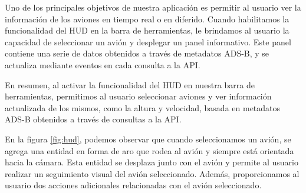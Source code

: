 \documentclass[a4paper, 11pt]{book}
\begin{document}
Uno de los principales objetivos de nuestra aplicación es permitir al usuario ver la información de los aviones en tiempo real o en diferido. Cuando habilitamos la funcionalidad del HUD en la barra de herramientas, le brindamos al usuario la capacidad de seleccionar un avión y desplegar un panel informativo. Este panel contiene una serie de datos obtenidos a través de metadatos ADS-B, y se actualiza mediante eventos en cada consulta a la API.  

En resumen, al activar la funcionalidad del HUD en nuestra barra de herramientas, permitimos al usuario seleccionar aviones y ver información actualizada de los mismos, como la altura y velocidad, basada en metadatos ADS-B obtenidos a través de consultas a la API.

En la figura \ref{fig:hud}, podemos observar que cuando seleccionamos un avión, se agrega una entidad en forma de aro que rodea al avión y siempre está orientada hacia la cámara. Esta entidad se desplaza junto con el avión y permite al usuario realizar un seguimiento visual del avión seleccionado. Además, proporcionamos al usuario dos acciones adicionales relacionadas con el avión seleccionado.
\end{document}
